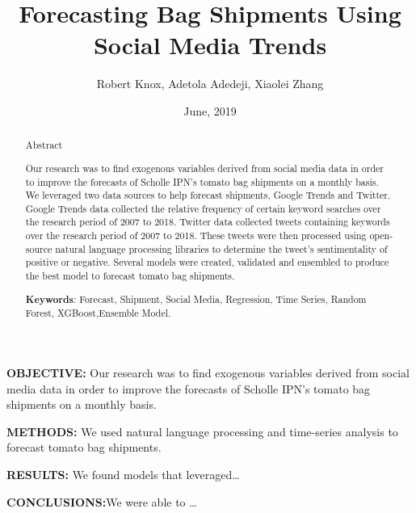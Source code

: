 \documentclass[12pt,oneside]{chicagocapstone}
\title{Forecasting Bag Shipments Using Social Media Trends}
\author{Robert Knox, Adetola Adedeji, Xiaolei Zhang}
\date{June, 2019} %
\begin{document}
  \maketitle

\frontmatter %
\pagestyle{empty} %


  \begin{abstract}
    Abstract
    
    Our research was to find exogenous variables derived from social media
    data in order to improve the forecasts of Scholle IPN's tomato bag
    shipments on a monthly basis. We leveraged two data sources to help
    forecast shipments, Google Trends and Twitter. Google Trends data
    collected the relative frequency of certain keyword searches over the
    research period of 2007 to 2018. Twitter data collected tweets
    containing keywords over the research period of 2007 to 2018. These
    tweets were then processed using open-source natural language processing
    libraries to determine the tweet's sentimentality of positive or
    negative. Several models were created, validated and ensembled to
    produce the best model to forecast tomato bag shipments.
    
    \bigskip  \bigskip
    \bigskip
    
    \textbf{Keywords}: Forecast, Shipment, Social Media, Regression, Time
    Series, Random Forest, XGBoost,Ensemble Model.
    
    \bigskip  \bigskip
    \bigskip
  \end{abstract}
  \begin{executive}
    \textbf{OBJECTIVE:} Our research was to find exogenous variables derived
    from social media data in order to improve the forecasts of Scholle
    IPN's tomato bag shipments on a monthly basis.
    
    \textbf{METHODS:} We used natural language processing and time-series
    analysis to forecast tomato bag shipments.
    
    \textbf{RESULTS:} We found models that leveraged\ldots{}
    
    \textbf{CONCLUSIONS:}We were able to \ldots{}
    
    \bigskip
    \bigskip
    \bigskip
  \end{executive}




  \hypersetup{linkcolor=black}
  \setcounter{tocdepth}{2}
  \tableofcontents
\end{document}
